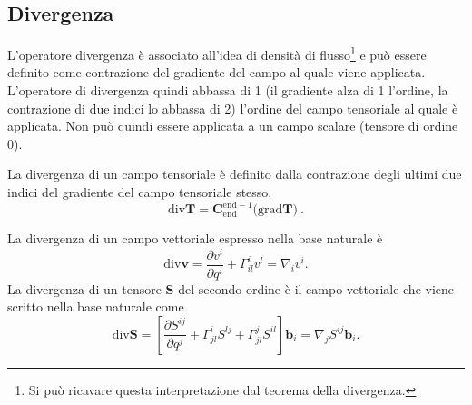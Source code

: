 

\subsection{Divergenza}
L'operatore divergenza è associato all'idea di densità di flusso\footnote{Si può ricavare questa interpretazione dal teorema della divergenza.} e può essere definito come contrazione del gradiente del campo al quale viene applicata. L'operatore di divergenza quindi abbassa di 1 (il gradiente alza di 1 l'ordine, la contrazione di due indici lo abbassa di 2) l'ordine del campo tensoriale al quale è applicata. Non può quindi essere applicata a un campo scalare (tensore di ordine 0).
\begin{operator}[Divergenza]
 La divergenza di un campo tensoriale è definito dalla contrazione degli ultimi due indici del gradiente del campo tensoriale stesso.
\begin{equation}\label{eqn:div:def}
 \text{div} \bm{T} = \bm{C}^{\text{end}-1}_{\text{end}} \big( \text{grad} \bm{T} \big)\  .
\end{equation}
\end{operator}
La divergenza di un campo vettoriale espresso nella base naturale è
\begin{equation}\label{eqn:div:vector}
 \text{div} \bm{v} = \dfrac{\partial v^{i}}{\partial q^i} + \Gamma_{il}^i v^{l} = \nabla_i v^{i} .
\end{equation}
 La divergenza di un tensore $\bm{S}$ del secondo ordine è il campo vettoriale che viene scritto nella base naturale come
 \begin{equation}\label{eqn:div:tensor2}
   \text{div} \bm{S} = \left[ \dfrac{\partial S^{ij}}{\partial q^j} + \Gamma_{jl}^i S^{lj} + \Gamma_{jl}^j S^{il} \right]
               \bm{b}_i = \nabla_j S^{ij} \bm{b}_i .
 \end{equation}

